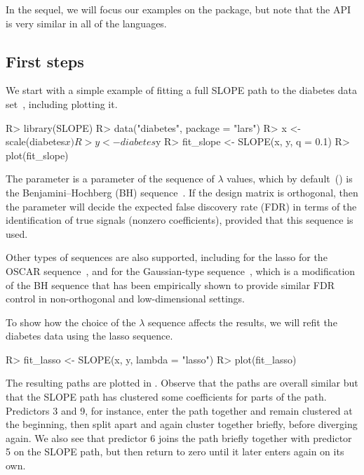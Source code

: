 \documentclass[article]{jss}
\let\Cref\crtCref
\begin{document}
In the sequel, we will focus our examples on the  package, but
note that the API is very similar in all of the languages.

\subsection{First steps}

We start with a simple example of fitting a full SLOPE path to the diabetes
data set~\citep{efron2004}, including plotting it.

\begin{Code}
R> library(SLOPE)
R> data("diabetes", package = "lars")
R> x <- scale(diabetes$x)
R> y <- diabetes$y
R> fit_slope <- SLOPE(x, y, q = 0.1)
R> plot(fit_slope)
\end{Code}

The  parameter is a parameter of the sequence of \(\lambda\) values,
which by default~() is the Benjamini--Hochberg (BH)
sequence~\citep{bogdan2015}. If the design matrix is orthogonal, then the
 parameter will decide the expected false discovery rate (FDR) in terms
of the identification of true signals (nonzero coefficients), provided
that this sequence is used.

Other types of sequences are also supported,
including  for the lasso
 for the OSCAR sequence~\citep{bondell2008}, and
 for the Gaussian-type sequence~\citep{bogdan2015},
which is a modification of the BH sequence that has been empirically shown to
provide similar FDR control in non-orthogonal and low-dimensional settings.

To show how the choice of the \(\lambda\) sequence affects the
results, we will refit the diabetes data using the lasso sequence.

\begin{Code}
R> fit_lasso <- SLOPE(x, y, lambda = "lasso")
R> plot(fit_lasso)
\end{Code}

The resulting paths are plotted in \Cref{fig:diabetes}. Observe that the
paths are overall similar but that the SLOPE path has clustered
some coefficients for parts of the path. Predictors 3 and 9, for instance,
enter the path together and remain clustered at the beginning, then
split apart and again cluster together briefly, before diverging again.
We also see that predictor 6 joins the path briefly together
with predictor 5 on the SLOPE path, but then return to zero until
it later enters again on its own.
\end{document}
